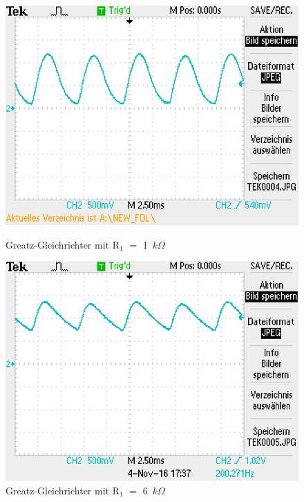\begin{figure}
\begin{minipage}{0.4\textwidth}
\begin{center}
\includegraphics[scale=0.7]{bild/TEK0004}
\caption{Greatz-Gleichrichter mit R$_1$ $=$ 1~$k\Omega$}
\end{center}
\end{minipage}
\hfill
\begin{minipage}{0.4\textwidth}
\begin{center}
\includegraphics[scale=0.7]{bild/TEK0005}
\caption{Greatz-Gleichrichter  mit R$_1$ $=$ 6~$k\Omega$}
\end{center}
\end{minipage}
\end{figure}
